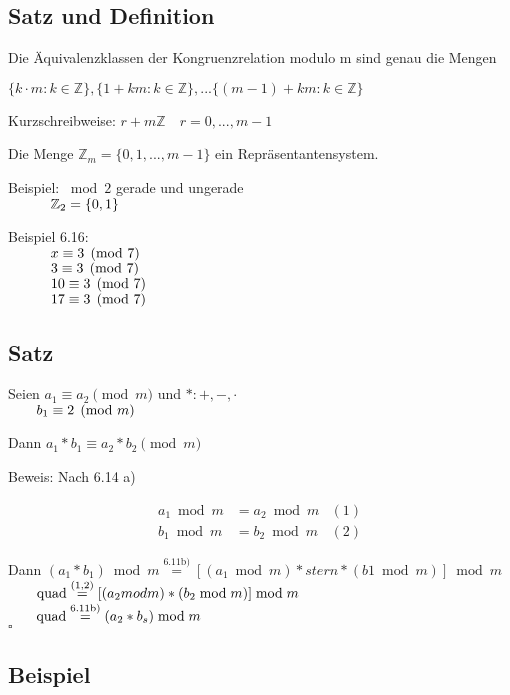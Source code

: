 \documentclass[a4paper, 12pt, twoside] {article}
\begin{document}
\subsection{Satz und Definition} %

Die Äquivalenzklassen der Kongruenzrelation modulo m sind genau die Mengen

$\{k \cdot m : k \in \mathbb{Z}\}, \{1 + km : k \in \mathbb{Z}\}, ... \{(m-1)+km : k \in \mathbb{Z}\}$

Kurzschreibweise: $r+m \mathbb{Z} \quad r=0, ..., m-1$

Die Menge $\mathbb{Z}_m = \{0,1,...,m-1\}$ ein Repräsentantensystem.

Beispiel: $\bmod 2$ gerade und ungerade \\
$\text{\qquad \quad}\mathbb{Z}_2 = \{0,1\}$

Beispiel 6.16: \\
$\text{\qquad \quad} x \equiv 3 \pmod 7$ \\
$\text{\qquad \quad} 3 \equiv 3 \pmod 7$ \\
$\text{\qquad \quad} 10 \equiv 3 \pmod 7$ \\
$\text{\qquad \quad} 17 \equiv 3 \pmod 7$ \\

\subsection{Satz} %

Seien $a_1 \equiv a_2 \pmod m$ und $*: +,-,\cdot$ \\
$\text{\qquad} b_1 \equiv 2 \pmod m$
	
Dann $a_1 * b_1 \equiv a_2 * b_2 \pmod m$
	
Beweis:	Nach 6.14 a)

\begin{align*}
a_1 \bmod m &= a_2 \bmod m & (1) \\
b_1 \bmod m &= b_2 \bmod m & (2)
\end{align*}

Dann $(a_1 * b_1) \bmod m \overset{\text{6.11b)}}{=} [(a_1 \bmod m) *stern* (b1 \bmod m) ] \bmod m$ \\
$\text{\qquad quad} \overset{(1,2)}{=}  [(a_2 mod m) * (b_2 \bmod m)] \bmod m$ \\
$\text{\qquad quad} \overset{\text{6.11b)}}{=} (a_2 * b_s) \bmod m $ \\

\hfill $\square$


\subsection{Beispiel}%
\end{document}

